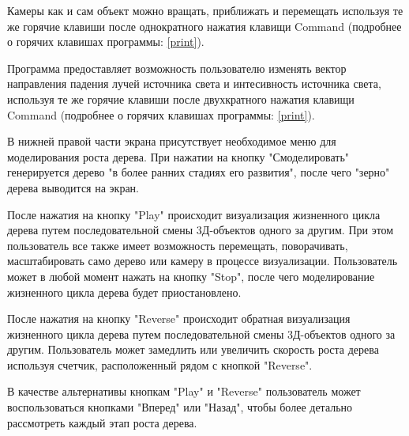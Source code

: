 \documentclass[54pt, a4paper]{article}
\begin{document}
	Камеры как и сам объект можно вращать, приближать и перемещать используя те же горячие клавиши после однократного нажатия клавищи Command (подробнее о горячих клавишах программы: \ref{print}).
	
	Программа предоставляет возможность пользователю изменять вектор направления падения лучей источника света и интесивность источника света, используя те же горячие клавиши после двухкратного нажатия клавищи Command (подробнее о горячих клавишах программы: \ref{print}).

	В нижней правой части экрана присутствует необходимое меню для моделирования роста дерева. При нажатии на кнопку "Смоделировать" генерируется дерево "в более ранних стадиях его развития", после чего "зерно" дерева выводится на экран.
	
	После нажатия на кнопку "Play" происходит визуализация жизненного цикла дерева путем последовательной смены 3Д-объектов одного за другим. При этом пользователь все также имеет возможность перемещать, поворачивать, масштабировать само дерево или камеру в процессе визуализации. Пользователь может в любой момент нажать на кнопку "Stop", после чего моделирование жизненного цикла дерева будет приостановлено. 
	
	После нажатия на кнопку "Reverse" происходит обратная визуализация жизненного цикла дерева путем последовательной смены 3Д-объектов одного за другим. Пользователь может замедлить или увеличить скорость роста дерева используя счетчик, расположенный рядом с кнопкой "Reverse".
	
	В качестве альтернативы кнопкам "Play" и "Reverse" пользователь может воспользоваться кнопками "Вперед" или "Назад", чтобы более детально рассмотреть каждый этап роста дерева.
	\newpage
	
\end{document}
